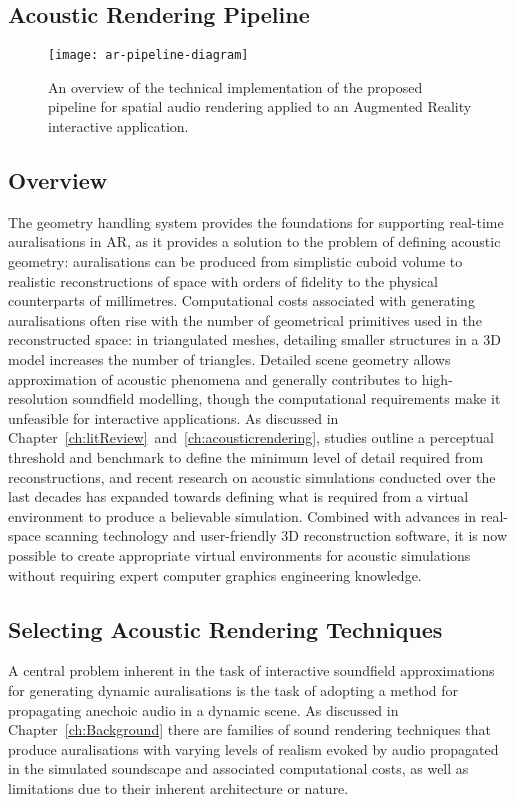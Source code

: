 \subsection{Acoustic Rendering Pipeline}
\begin{figure}[htb]
    \centering
    \texttt{[image: ar-pipeline-diagram]}
    \caption{An overview of the technical implementation of the proposed pipeline for spatial audio rendering applied to an Augmented Reality interactive application. }
    \label{fig:ar-pipeline-overview}
\end{figure}

\subsection{Overview}
The geometry handling system provides the foundations for supporting real-time auralisations in AR, as it provides a solution to the problem of defining acoustic geometry: auralisations can be produced from simplistic cuboid volume to realistic reconstructions of space with orders of fidelity to the physical counterparts of millimetres. Computational costs associated with generating auralisations often rise with the number of geometrical primitives used in the reconstructed space: in triangulated meshes, detailing smaller structures in a 3D model increases the number of triangles. Detailed scene geometry allows approximation of acoustic phenomena and generally contributes to high-resolution soundfield modelling, though the computational requirements make it unfeasible for interactive applications. As discussed in Chapter~\ref{ch:litReview}~and~\ref{ch:acousticrendering}, studies outline a perceptual threshold and benchmark to define the minimum level of detail required from reconstructions, and recent research on acoustic simulations conducted over the last decades has expanded towards defining what is required from a virtual environment to produce a believable simulation. Combined with advances in real-space scanning technology and user-friendly 3D reconstruction software, it is now possible to create appropriate virtual environments for acoustic simulations without requiring expert computer graphics engineering knowledge.\par

\subsection{Selecting Acoustic Rendering Techniques}
A central problem inherent in the task of interactive soundfield approximations for generating dynamic auralisations is the task of adopting a method for propagating anechoic audio in a dynamic scene. As discussed in Chapter~\ref{ch:Background} there are families of sound rendering techniques that produce auralisations with varying levels of realism evoked by audio propagated in the simulated soundscape and associated computational costs, as well as limitations due to their inherent architecture or nature.

